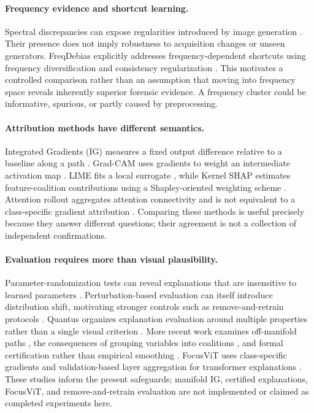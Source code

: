 \documentclass{article}
\begin{document}
\paragraph{Frequency evidence and shortcut learning.}
Spectral discrepancies can expose regularities introduced by image generation \citep{frank2020}. Their presence does not imply robustness to acquisition changes or unseen generators. FreqDebias explicitly addresses frequency-dependent shortcuts using frequency diversification and consistency regularization \citep{kashiani2025}. This motivates a controlled comparison rather than an assumption that moving into frequency space reveals inherently superior forensic evidence. A frequency cluster could be informative, spurious, or partly caused by preprocessing.

\paragraph{Attribution methods have different semantics.}
Integrated Gradients (IG) measures a fixed output difference relative to a baseline along a path \citep{sundararajan2017}. Grad-CAM uses gradients to weight an intermediate activation map \citep{selvaraju2017}. LIME fits a local surrogate \citep{ribeiro2016}, while Kernel SHAP estimates feature-coalition contributions using a Shapley-oriented weighting scheme \citep{lundberg2017}. Attention rollout aggregates attention connectivity and is not equivalent to a class-specific gradient attribution \citep{abnar2020}. Comparing these methods is useful precisely because they answer different questions; their agreement is not a collection of independent confirmations.

\paragraph{Evaluation requires more than visual plausibility.}
Parameter-randomization tests can reveal explanations that are insensitive to learned parameters \citep{adebayo2018}. Perturbation-based evaluation can itself introduce distribution shift, motivating stronger controls such as remove-and-retrain protocols \citep{hooker2019}. Quantus organizes explanation evaluation around multiple properties rather than a single visual criterion \citep{hedstrom2023}. More recent work examines off-manifold paths \citep{zaher2024}, the consequences of grouping variables into coalitions \citep{zheng2025}, and formal certification rather than empirical smoothing \citep{anani2025}. FocusViT uses class-specific gradients and validation-based layer aggregation for transformer explanations \citep{ali2026}. These studies inform the present safeguards; manifold IG, certified explanations, FocusViT, and remove-and-retrain evaluation are not implemented or claimed as completed experiments here.
\end{document}
